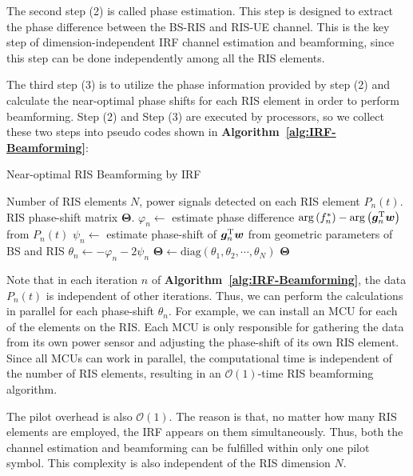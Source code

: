\documentclass[12pt,draftclsnofoot,journal,onecolumn]{IEEEtran}
\theoremstyle{nonumberplain}
\def \diag {\text{diag}}
\def \arg {\text{arg}}
\begin{document}
    The second step (2) is called phase estimation. This step is designed to extract the phase difference between the BS-RIS and RIS-UE channel. This is the key step of dimension-independent IRF channel estimation and beamforming, since this step can be done independently among all the RIS elements. 

    The third step (3) is to utilize the phase information provided by step (2) and calculate the near-optimal phase shifts for each RIS element in order to perform beamforming. Step (2) and Step (3) are executed by processors, so we collect these two steps into pseudo codes shown in {\bf Algorithm~\ref{alg:IRF-Beamforming}}:
    \begin{algorithm}[H] 
        \caption{Near-optimal RIS Beamforming by IRF} \label{alg:IRF-Beamforming}
        \begin{algorithmic}[1]
            \REQUIRE Number of RIS elements $N$, power signals detected on each RIS element $P_n(t)$.
            \ENSURE RIS phase-shift matrix ${\bm \Theta}$.
                \STATE $\varphi_n \leftarrow$ estimate phase difference  $\arg\left(f_{n}^{*}\right)-\arg\left(\bm g_{n}^{\rm T}\bm w\right)$ from $P_n(t)$
                \STATE $\psi_{n} \leftarrow$ estimate phase-shift of $\bm g_{n}^{\rm T}\bm w$ from geometric parameters of BS and RIS
                \STATE $\theta_n \leftarrow -\varphi_n - 2\psi_n$
            \ENDFOR
            \STATE ${\bm \Theta} \leftarrow \diag(\theta_1, \theta_2, \cdots, \theta_N)$
            \RETURN ${\bm \Theta}$
        \end{algorithmic}
    \end{algorithm}
    Note that in each iteration $n$ of {\bf Algorithm~\ref{alg:IRF-Beamforming}}, the data $P_n(t)$ is independent of other iterations. Thus, we can perform the calculations in parallel for each phase-shift $\theta_n$. For example, we can install an MCU for each of the elements on the RIS. Each MCU is only responsible for gathering the data from its own power sensor and adjusting the phase-shift of its own RIS element. Since all MCUs can work in parallel, the computational time is independent of the number of RIS elements, resulting in an $\mathcal{O}(1)$-time RIS beamforming algorithm. 

    The pilot overhead is also $\mathcal{O}(1)$. The reason is that, no matter how many RIS elements are employed, the IRF appears on them simultaneously. Thus, both the channel estimation and beamforming can be fulfilled within only one pilot symbol. This complexity is also independent of the RIS dimension $N$. 
\end{document}
